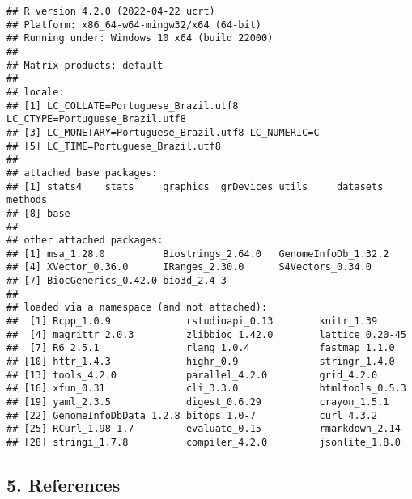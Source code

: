 \documentclass[
]{article}
\begin{document}
\begin{verbatim}
## R version 4.2.0 (2022-04-22 ucrt)
## Platform: x86_64-w64-mingw32/x64 (64-bit)
## Running under: Windows 10 x64 (build 22000)
## 
## Matrix products: default
## 
## locale:
## [1] LC_COLLATE=Portuguese_Brazil.utf8  LC_CTYPE=Portuguese_Brazil.utf8   
## [3] LC_MONETARY=Portuguese_Brazil.utf8 LC_NUMERIC=C                      
## [5] LC_TIME=Portuguese_Brazil.utf8    
## 
## attached base packages:
## [1] stats4    stats     graphics  grDevices utils     datasets  methods  
## [8] base     
## 
## other attached packages:
## [1] msa_1.28.0          Biostrings_2.64.0   GenomeInfoDb_1.32.2
## [4] XVector_0.36.0      IRanges_2.30.0      S4Vectors_0.34.0   
## [7] BiocGenerics_0.42.0 bio3d_2.4-3        
## 
## loaded via a namespace (and not attached):
##  [1] Rcpp_1.0.9             rstudioapi_0.13        knitr_1.39            
##  [4] magrittr_2.0.3         zlibbioc_1.42.0        lattice_0.20-45       
##  [7] R6_2.5.1               rlang_1.0.4            fastmap_1.1.0         
## [10] httr_1.4.3             highr_0.9              stringr_1.4.0         
## [13] tools_4.2.0            parallel_4.2.0         grid_4.2.0            
## [16] xfun_0.31              cli_3.3.0              htmltools_0.5.3       
## [19] yaml_2.3.5             digest_0.6.29          crayon_1.5.1          
## [22] GenomeInfoDbData_1.2.8 bitops_1.0-7           curl_4.3.2            
## [25] RCurl_1.98-1.7         evaluate_0.15          rmarkdown_2.14        
## [28] stringi_1.7.8          compiler_4.2.0         jsonlite_1.8.0
\end{verbatim}

\hypertarget{references}{%
\subsection*{5. References}\label{references}}
\end{document}
